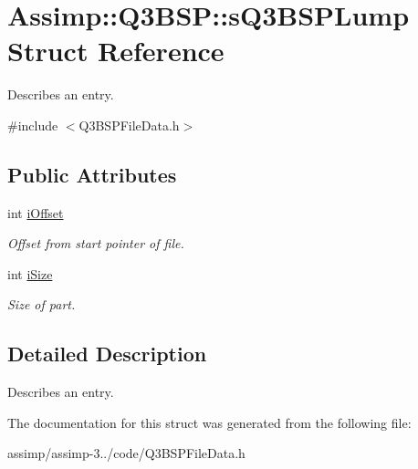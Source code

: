 \hypertarget{struct_assimp_1_1_q3_b_s_p_1_1s_q3_b_s_p_lump}{\section{Assimp\+:\+:Q3\+B\+S\+P\+:\+:s\+Q3\+B\+S\+P\+Lump Struct Reference}
\label{struct_assimp_1_1_q3_b_s_p_1_1s_q3_b_s_p_lump}
}


Describes an entry.  




{\ttfamily \#include $<$Q3\+B\+S\+P\+File\+Data.\+h$>$}

\subsection*{Public Attributes}
\begin{DoxyCompactItemize}
\item 
\hypertarget{struct_assimp_1_1_q3_b_s_p_1_1s_q3_b_s_p_lump_ad7c79c9bd358c9c69b24785f131a86d3}{int \hyperlink{struct_assimp_1_1_q3_b_s_p_1_1s_q3_b_s_p_lump_ad7c79c9bd358c9c69b24785f131a86d3}{i\+Offset}}\label{struct_assimp_1_1_q3_b_s_p_1_1s_q3_b_s_p_lump_ad7c79c9bd358c9c69b24785f131a86d3}

\begin{DoxyCompactList}\small\item\em Offset from start pointer of file. \end{DoxyCompactList}\item 
\hypertarget{struct_assimp_1_1_q3_b_s_p_1_1s_q3_b_s_p_lump_a543fde075f35c9a71b01f839a5f13826}{int \hyperlink{struct_assimp_1_1_q3_b_s_p_1_1s_q3_b_s_p_lump_a543fde075f35c9a71b01f839a5f13826}{i\+Size}}\label{struct_assimp_1_1_q3_b_s_p_1_1s_q3_b_s_p_lump_a543fde075f35c9a71b01f839a5f13826}

\begin{DoxyCompactList}\small\item\em Size of part. \end{DoxyCompactList}\end{DoxyCompactItemize}


\subsection{Detailed Description}
Describes an entry. 

The documentation for this struct was generated from the following file\+:\begin{DoxyCompactItemize}
\item 
assimp/assimp-\/3../code/Q3\+B\+S\+P\+File\+Data.\+h\end{DoxyCompactItemize}
